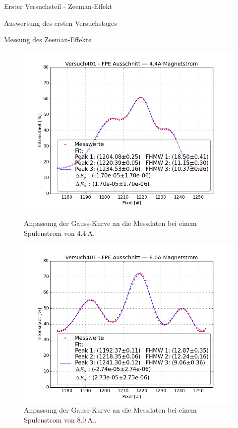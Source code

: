 \documentclass[pdftex, a4paper,11pt, twoside, ngerman]{report}
\begin{document}
\begin{chapter}{Erster Versuchsteil - Zeeman-Effekt}
\begin{section}{Auswertung des ersten Versuchstages}
\begin{subsection}{Messung des Zeeman-Effekts}
\begin{figure}[b!]
\begin{minipage}{0.48\textwidth}
            \includegraphics[width=\textwidth]
      {Figures/Versuch401-FPEAusschnitt-4_4AMagnetstrom_Pixel_Intensitaet.png}
            \caption{Anpassung der Gauss-Kurve an die Messdaten bei einem
                Spulenstrom von $\SI{4.4}{\ampere}$.}
            \label{fig:FPEAusschnitt44}
          \end{minipage}\quad
          \begin{minipage}{0.48\textwidth}
            \centering
            \includegraphics[width=\textwidth]
      {Figures/Versuch401-FPEAusschnitt-8_0AMagnetstrom_Pixel_Intensitaet.png}
                \caption{Anpassung der Gauss-Kurve an die Messdaten bei einem
                Spulenstrom von $\SI{8.0}{\ampere}$..}
            \label{fig:FPEAusschnitt80}

\end{minipage}
\end{figure}
\end{subsection}
\end{section}
\end{chapter}
\end{document}
